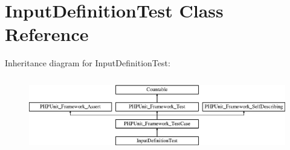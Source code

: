 \section{Input\+Definition\+Test Class Reference}
\label{class_symfony_1_1_component_1_1_console_1_1_tests_1_1_input_1_1_input_definition_test}
Inheritance diagram for Input\+Definition\+Test\+:\begin{figure}[H]
\begin{center}
\leavevmode
\includegraphics[height=3.303835cm]{class_symfony_1_1_component_1_1_console_1_1_tests_1_1_input_1_1_input_definition_test}
\end{center}
\end{figure}
